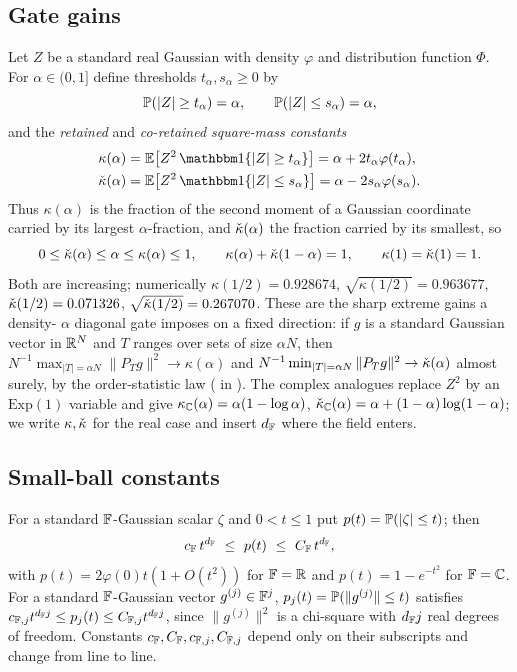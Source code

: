 \subsection{Gate gains}
Let $Z$ be a standard real Gaussian with density $\varphi$ and distribution function $\Phi$. For
$\alpha\in(0,1]$ define thresholds $t_\alpha,s_\alpha\ge0$ by
\[
  \mathbb{P}(|Z|\ge t_\alpha)=\alpha,\qquad \mathbb{P}(|Z|\le s_\alpha)=\alpha,
\]
and the \emph{retained} and \emph{co-retained square-mass constants}
\begin{align}
  \kappa(\alpha)&=\EE\bigl[Z^2\,\one\{|Z|\ge t_\alpha\}\bigr]=\alpha+2t_\alpha\varphi(t_\alpha),\label{eq:kappa}\\
  \kcheck(\alpha)&=\EE\bigl[Z^2\,\one\{|Z|\le s_\alpha\}\bigr]=\alpha-2s_\alpha\varphi(s_\alpha).\label{eq:kcheck}
\end{align}
Thus $\kappa(\alpha)$ is the fraction of the second moment of a Gaussian coordinate carried by its
largest $\alpha$-fraction, and $\check{\kappa}(\alpha)$ the fraction carried by its smallest, so
\[
  0\le\check{\kappa}(\alpha)\le\alpha\le\kappa(\alpha)\le1,\qquad
  \kappa(\alpha)+\check{\kappa}(1-\alpha)=1,\qquad \kappa(1)=\check{\kappa}(1)=1 .
\]
Both are increasing; numerically $\kappa(1/2)=0.928674$, $\sqrt{\kappa(1/2)}=0.963677$,
$\check{\kappa}(1/2)=0.071326$, $\sqrt{\check{\kappa}(1/2)}=0.267070$. These are the sharp extreme gains a density-%
$\alpha$ diagonal gate imposes on a fixed direction: if $g$ is a standard Gaussian vector in $\mathbb{R}^N$
and $T$ ranges over sets of size $\alpha N$, then $N^{-1}\max_{|T|=\alpha N}\|P_Tg\|^2\to\kappa(\alpha)$
and $N^{-1}\min_{|T|=\alpha N}\|P_Tg\|^2\to\check{\kappa}(\alpha)$ almost surely, by the order-statistic law
( in ). The complex analogues replace $Z^2$ by an $\mathrm{Exp}(1)$
variable and give $\kappa_{\mathbb{C}}(\alpha)=\alpha(1-\log\alpha)$, $\check{\kappa}_{\mathbb{C}}(\alpha)=\alpha+ (1-\alpha)\log(1-\alpha)$;
we write $\kappa,\check{\kappa}$ for the real case and insert $d_{\mathbb{F}}$ where the field enters.

\subsection{Small-ball constants}
For a standard $\mathbb{F}$-Gaussian scalar $\zeta$ and $0<t\le1$ put $p(t)=\mathbb{P}(|\zeta|\le t)$; then
\begin{equation}\label{eq:pball}
  c_{\mathbb{F}}\,t^{d_{\mathbb{F}}}\ \le\ p(t)\ \le\ C_{\mathbb{F}}\,t^{d_{\mathbb{F}}},
\end{equation}
with $p(t)=2\varphi(0)t(1+O(t^2))$ for $\mathbb{F}=\mathbb{R}$ and $p(t)=1-e^{-t^2}$ for $\mathbb{F}=\mathbb{C}$. For a standard
$\mathbb{F}$-Gaussian vector $g^{(j)}\in\mathbb{F}^j$, $p_j(t)=\mathbb{P}(\|g^{(j)}\|\le t)$ satisfies
$c_{\mathbb{F},j}t^{d_{\mathbb{F}} j}\le p_j(t)\le C_{\mathbb{F},j}t^{d_{\mathbb{F}} j}$, since $\|g^{(j)}\|^2$ is a chi-square with
$d_{\mathbb{F}} j$ real degrees of freedom. Constants $c_{\mathbb{F}},C_{\mathbb{F}},c_{\mathbb{F},j},C_{\mathbb{F},j}$ depend only on their
subscripts and change from line to line.

